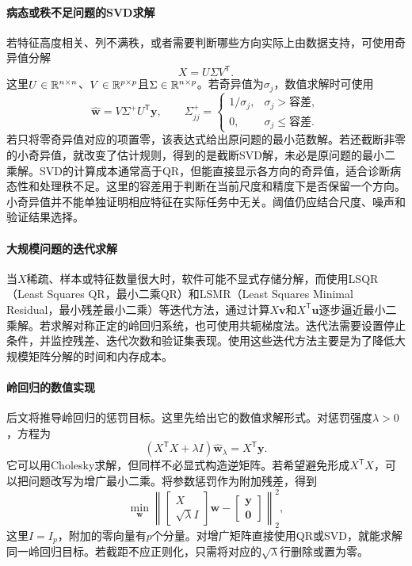 \paragraph{病态或秩不足问题的SVD求解}
若特征高度相关、列不满秩，或者需要判断哪些方向实际上由数据支持，可使用奇异值分解
\begin{equation}
 X=U\Sigma V^{\mathsf T}.
\end{equation}
这里$U\in\mathbb{R}^{n\times n}$、$V\in\mathbb{R}^{p\times p}$且$\Sigma\in\mathbb{R}^{n\times p}$。若奇异值为$\sigma_j$，数值求解时可使用
\begin{equation}
 \hat{\bm w}=V\Sigma^+U^{\mathsf T}\bm y,
 \qquad
 \Sigma^+_{jj}=\begin{cases}
 1/\sigma_j,&\sigma_j>\text{容差},\\
 0,&\sigma_j\leq\text{容差}.
 \end{cases}
\end{equation}
若只将零奇异值对应的项置零，该表达式给出原问题的最小范数解。若还截断非零的小奇异值，就改变了估计规则，得到的是截断SVD解，未必是原问题的最小二乘解。SVD的计算成本通常高于QR，但能直接显示各方向的奇异值，适合诊断病态性和处理秩不足。这里的容差用于判断在当前尺度和精度下是否保留一个方向。小奇异值并不能单独证明相应特征在实际任务中无关。阈值仍应结合尺度、噪声和验证结果选择。

\paragraph{大规模问题的迭代求解}
当$X$稀疏、样本或特征数量很大时，软件可能不显式存储分解，而使用LSQR（Least Squares QR，最小二乘QR）和LSMR（Least Squares Minimal Residual，最小残差最小二乘）等迭代方法，通过计算$X\bm v$和$X^{\mathsf T}\bm u$逐步逼近最小二乘解。若求解对称正定的岭回归系统，也可使用共轭梯度法。迭代法需要设置停止条件，并监控残差、迭代次数和验证集表现。使用这些迭代方法主要是为了降低大规模矩阵分解的时间和内存成本。

\paragraph{岭回归的数值实现}
后文将推导岭回归的惩罚目标。这里先给出它的数值求解形式。对惩罚强度$\lambda>0$，方程为
\begin{equation}
 (X^{\mathsf T}X+\lambda I)\hat{\bm w}_\lambda=X^{\mathsf T}\bm y.
\end{equation}
它可以用Cholesky求解，但同样不必显式构造逆矩阵。若希望避免形成$X^{\mathsf T}X$，可以把问题改写为增广最小二乘。将参数惩罚作为附加残差，得到
\begin{equation}
 \min_{\bm w}
 \left\|\begin{bmatrix}X\\ \sqrt{\lambda}I\end{bmatrix}\bm w-
 \begin{bmatrix}\bm y\\ \bm0\end{bmatrix}\right\|_2^2,
\end{equation}
这里$I=I_p$，附加的零向量有$p$个分量。对增广矩阵直接使用QR或SVD，就能求解同一岭回归目标。若截距不应正则化，只需将对应的$\sqrt{\lambda}$行删除或置为零。

